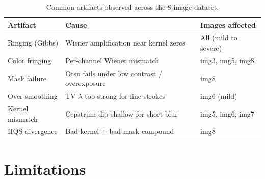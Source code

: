 \documentclass[12pt,a4paper]{article}
\begin{document}
\begin{table}[H]
  \centering
  \caption{Common artifacts observed across the 8-image dataset.}
  \label{tab:artifacts}
  \small
  \begin{tabular}{@{}lll@{}}
    \toprule
    \textbf{Artifact} & \textbf{Cause} & \textbf{Images affected} \\
    \midrule
    Ringing (Gibbs)   & Wiener amplification near kernel zeros          & All (mild to severe) \\
    Color fringing    & Per-channel Wiener mismatch                     & img3, img5, img8 \\
    Mask failure      & Otsu fails under low contrast / overexposure    & img8 \\
    Over-smoothing    & TV $\lambda$ too strong for fine strokes         & img6 (mild) \\
    Kernel mismatch   & Cepstrum dip shallow for short blur              & img5, img6, img7 \\
    HQS divergence    & Bad kernel + bad mask compound                  & img8 \\
    \bottomrule
  \end{tabular}
\end{table}

\section{Limitations}
\end{document}
